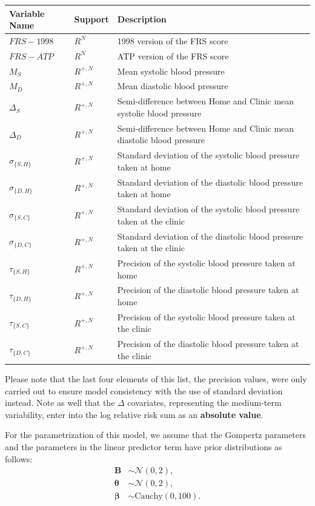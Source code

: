 \documentclass[
]{article}
\begin{document}
\begin{tabular}{lll}
\toprule
Variable Name & Support & Description\\
\midrule
$FRS-1998$ & $R^N$ & 1998 version of the FRS score\\
$FRS-ATP$ & $R^N$ & ATP version of the FRS score\\
$M_S$ & $R^{+,N}$ & Mean systolic blood pressure\\
$M_D$ & $R^{+,N}$ & Mean diastolic blood pressure\\
$\Delta_S$ & $R^{+,N}$ & Semi-difference between Home and Clinic mean systolic blood pressure\\
$\Delta_D$ & $R^{+,N}$ & Semi-difference between Home and Clinic mean diastolic blood pressure\\
$\sigma_{\{S,H\}}$ & $R^{+,N}$ & Standard deviation of the systolic blood pressure taken at home\\
$\sigma_{\{D,H\}}$ & $R^{+,N}$ & Standard deviation of the diastolic blood pressure taken at home\\
$\sigma_{\{S,C\}}$ & $R^{+,N}$ & Standard deviation of the systolic blood pressure taken at the clinic\\
$\sigma_{\{D,C\}}$ & $R^{+,N}$ & Standard deviation of the diastolic blood pressure taken at the clinic\\
$\tau_{\{S,H\}}$ & $R^{+,N}$ & Precision of the systolic blood pressure taken at home\\
$\tau_{\{D,H\}}$ & $R^{+,N}$ & Precision of the diastolic blood pressure taken at home\\
$\tau_{\{S,C\}}$ & $R^{+,N}$ & Precision of the systolic blood pressure taken at the clinic\\
$\tau_{\{D,C\}}$ & $R^{+,N}$ & Precision of the diastolic blood pressure taken at the clinic\\
\bottomrule
\end{tabular}

Please note that the last four elements of this list, the precision values, were only carried out to ensure model consistency with the use of standard deviation instead.
Note as well that the \(\Delta\) covariates, representing the medium-term variability, enter into the log relative risk sum as an \textbf{absolute value}.

For the parametrization of this model, we assume that the Gompertz parameters and the parameters in the linear predictor term have prior distributions as follows:
\begin{equation}\label{priorsS}
\begin{align*}
  \boldsymbol{B}&\sim\mathcal{N}(0,2),\\
  \boldsymbol{\theta}&\sim\mathcal{N}(0,2),\\
  \boldsymbol{\beta}&\sim \mathrm{Cauchy}(0,100).
\end{align*}
\end{equation}
\end{document}
